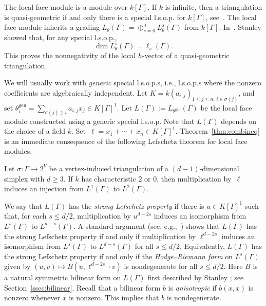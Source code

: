 The local face module is a module over $k[\Gamma]$. If $k$ is infinite, then a triangulation is quasi-geometric if and only there is a special l.s.o.p. for $k[\Gamma]$, see~\cite[Corollary~4.4]{Stanleylocalh}. The local face module inherits a grading $L_{\theta}(\Gamma) = \oplus_{s = 0}^d  L^s_{\theta}(\Gamma)$ 
from $k[\Gamma]$. 
In~\cite[Theorem 4.6]{Stanleylocalh}, Stanley showed that, for any special l.s.o.p., 
$$\dim L^s_{\theta}(\Gamma) = \ell_s(\Gamma).$$
This proves the nonnegativity of the local $h$-vector of a quasi-geometric triangulation. 

We will usually work with \emph{generic} special l.s.o.p.s, i.e., l.s.o.p.s where the nonzero coefficients are algebraically independent. Let $K = k(a_{i,j})_{1 \le j \le n, \, i \in \sigma(j)}$, and set $\theta_i^{\operatorname{gen}} = \sum_{\sigma(j) \ni i} a_{i,j} x_j \in K[\Gamma]^1$. Let $L(\Gamma) := L_{\theta^{\operatorname{gen}}}(\Gamma)$ be the local face module constructed using a generic special l.s.o.p. Note that $L(\Gamma)$ depends on the choice of a field $k$. Set~$\ell = x_1 + \dotsb + x_n \in K[\Gamma]^1$. 
Theorem~\ref{thm:combineq} is an immediate consequence of the following Lefschetz theorem for local face modules. 

\begin{theo}\label{thm:WL}
Let $\sigma \colon \Gamma \to 2^V$ be a vertex-induced triangulation of a $(d-1)$-dimensional simplex with $d \ge 3$. If $k$ has characteristic $2$ or $0$, then multiplication by~$\ell$ induces an injection from $L^1(\Gamma)$ to $L^2(\Gamma)$. 
\end{theo}

We say that $L(\Gamma)$ has the \emph{strong Lefschetz property} if there is $u \in K[\Gamma]^1$ such that, for each $s \le d/2$, multiplication by $u^{d- 2s}$ induces an isomorphism from $L^s(\Gamma)$ to $L^{d-s}(\Gamma)$. A standard argument (see, e.g.,~\cite[Lemma 5.1]{LNS}) shows that $L(\Gamma)$ has the strong Lefschetz property if and only if multiplication by $\ell^{d- 2s}$ induces an isomorphism from $L^s(\Gamma)$ to $L^{d-s}(\Gamma)$ for all $s \le d/2$. 
Equivalently, $L(\Gamma)$ has the strong Lefschetz property if and only if the \emph{Hodge--Riemann form} on $L^s(\Gamma)$ given by $(u, v) \mapsto B(u, \ell^{d - 2s} \cdot v)$ is nondegenerate  for all $s \le d/2$. Here $B$ is a natural symmetric bilinear form on $L(\Gamma)$ first described by Stanley 
\cite[Corollary 4.19]{Stanleylocalh}; see Section~\ref{ssec:bilinear}. 
Recall that a bilinear form $b$ is \emph{anisotropic} if $b(x,x)$ is nonzero whenever $x$ is nonzero. This implies that $b$ is nondegenerate. 

